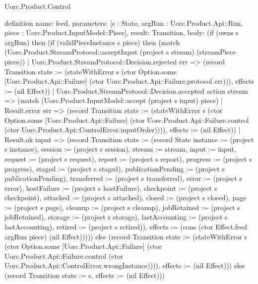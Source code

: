 \begin{lexlean}{Uorc.Product.Control}
\begin{semanticmodule}
definition{
  name: feed,
  parameters: [s : State, argRun : Uorc.Product.Api::Run, piece : Uorc.Product.InputModel::Piece],
  result: Transition,
  body: (if (owns s argRun) then (if (validPieceInstance s piece) then (match (Uorc.Product.StreamProtocol::acceptInput (project s stream) (streamPiece piece))
    | Uorc.Product.StreamProtocol::Decision.rejected err => (record Transition {state := (stateWithError s (ctor Option.some [Uorc.Product.Api::Failure] (ctor Uorc.Product.Api::Failure.protocol err))), effects := (nil Effect)})
    | Uorc.Product.StreamProtocol::Decision.accepted action stream => (match (Uorc.Product.InputModel::accept (project s input) piece)
      | Result.error err => (record Transition {state := (stateWithError s (ctor Option.some [Uorc.Product.Api::Failure] (ctor Uorc.Product.Api::Failure.control (ctor Uorc.Product.Api::ControlError.inputOrder)))), effects := (nil Effect)})
      | Result.ok input => (record Transition {state := (record State {instance := (project s instance), session := (project s session), stream := stream, input := input, request := (project s request), report := (project s report), progress := (project s progress), staged := (project s staged), publicationPending := (project s publicationPending), transferred := (project s transferred), error := (project s error), hostFailure := (project s hostFailure), checkpoint := (project s checkpoint), attached := (project s attached), closed := (project s closed), page := (project s page), cleanup := (project s cleanup), jobRetained := (project s jobRetained), storage := (project s storage), lastAccounting := (project s lastAccounting), retired := (project s retired)}), effects := (cons (ctor Effect.feed argRun piece) (nil Effect))}))) else (record Transition {state := (stateWithError s (ctor Option.some [Uorc.Product.Api::Failure] (ctor Uorc.Product.Api::Failure.control (ctor Uorc.Product.Api::ControlError.wrongInstance)))), effects := (nil Effect)})) else (record Transition {state := s, effects := (nil Effect)}))
}


\end{semanticmodule}
\end{lexlean}
